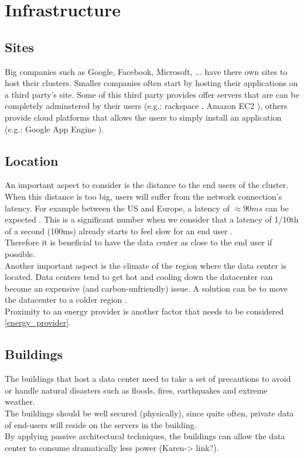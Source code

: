 \documentclass[12pt]{report}
\begin{document}
\section{Infrastructure}
\subsection{Sites}
Big companies such as Google, Facebook, Microsoft, ... have there own
sites to host their clusters. Smaller companies often start by hosting
their applications on a third party's site. Some of this third party
provides offer servers that are can be completely adminstered by their
users (e.g.: rackspace \cite{rackspace}, Amazon EC2 \cite{amazon_ec2}), others provide cloud
platforms that allows the users to simply install an application
(e.g.: Google App Engine \cite{google_app_engin}).

\subsection{Location}
An important aspect to consider is the distance to the end users of
the cluster. When this distance is too big, users will suffer from the
network connection's latency. For example between the US
and Europe, a latency of $\approx 90ms$ can be expected
\cite{verizon_latency}.
This is a significant number when we consider that a latency of 1/10th
of a second (100ms) already starts to feel slow for an end user 
\cite{web_app_latency}.\\
Therefore it is beneficial to have the data center as close to the end
user if possible.\\

Another important aspect is the climate of the region where the data
center is located. Data centers tend to get hot and cooling down the
datacenter can become an expensive (and carbon-unfriendly) issue.
A solution can be to move the datacenter to a colder region 
\cite{datacenter_cold}.\\

Proximity to an energy provider is another factor that needs to be
considered \ref{energy_provider}.

\subsection{Buildings}
The buildings that host a data center need to take a set of precautions to
avoid or handle natural disasters such as floods, fires, earthquakes
and extreme weather.\\
The buildings should be well secured (physically), since quite often, 
private data of end-users will reside on the servers in the
building.\\
By applying passive architectural techniques, the buildings can allow
the data center to consume dramatically less power (Karen-> link?).
 
\end{document}
